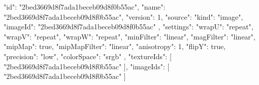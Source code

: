 {
  "id": "2bed3669d8f7ada1beceb09d8f0b55ac",
  "name": "2bed3669d8f7ada1beceb09d8f0b55ac",
  "version": 1,
  "source": {
    "kind": "image",
    "imageId": "2bed3669d8f7ada1beceb09d8f0b55ac"
  },
  "settings": {
    "wrapU": "repeat",
    "wrapV": "repeat",
    "wrapW": "repeat",
    "minFilter": "linear",
    "magFilter": "linear",
    "mipMap": true,
    "mipMapFilter": "linear",
    "anisotropy": 1,
    "flipY": true,
    "precision": "low",
    "colorSpace": "srgb"
  },
  "textureIds": [
    "2bed3669d8f7ada1beceb09d8f0b55ac"
  ],
  "imageIds": [
    "2bed3669d8f7ada1beceb09d8f0b55ac"
  ]
}
